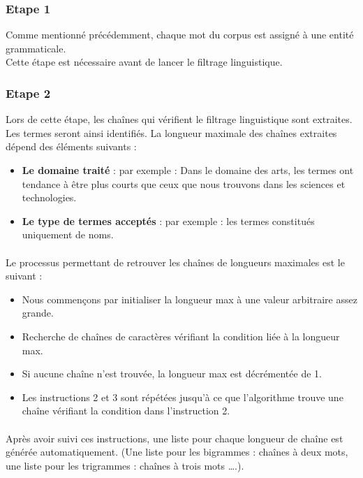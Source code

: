 \documentclass[12pt, a4paper, oneside]{book}
\begin{document}
\subsubsection{Etape 1}

Comme mentionné précédemment, chaque mot du corpus est assigné à une entité grammaticale.\\
Cette étape est nécessaire avant de lancer le filtrage linguistique.

\subsubsection{Etape 2}

Lors de cette étape, les chaînes qui vérifient le filtrage linguistique sont extraites.\\
Les termes seront ainsi identifiés. La longueur maximale des chaînes extraites dépend des éléments suivants :\\
\begin{itemize}
\item \textbf{Le domaine traité} : par exemple : Dans le domaine des arts, les termes ont tendance à être plus courts que ceux que nous trouvons dans les sciences et technologies.
\item \textbf{Le type de termes acceptés} : par exemple : les termes constitués uniquement de noms. 

\end{itemize}
\paragraph{}
Le processus permettant de retrouver les chaînes de longueurs maximales est le suivant : \\
\begin{itemize}

\item Nous commençons par initialiser la longueur max à une valeur arbitraire assez grande.
\item Recherche de chaînes de caractères vérifiant la condition liée à la longueur max.
\item Si aucune chaîne n'est trouvée, la longueur max est décrémentée de 1.
\item Les instructions 2 et 3 sont répétées jusqu'à ce que l'algorithme trouve une chaîne vérifiant la condition dans l'instruction 2.

\end{itemize}
\paragraph{}
Après avoir suivi ces instructions, une liste pour chaque longueur de chaîne est générée automatiquement. (Une liste pour les bigrammes : chaînes à deux mots, une liste pour les trigrammes : chaînes à trois mots ….).
\end{document}
